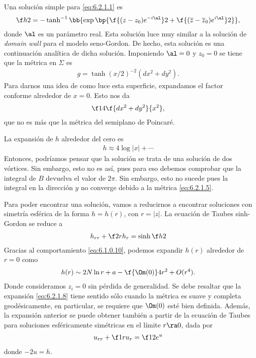 Una solución simple para \eqref{eq:6.2.1.1} es
\begin{align}
	\f h2 = -\tanh^{-1}\bb{\exp\bp{\f{(z-z_0)e^{-i\al}}2+\f{(\overline z-\overline z_0)e^{i\al}}2}},
\end{align}
donde $\al$ es un parámetro real. Esta solución luce muy similar a la solución de \emph{domain wall} para el modelo seno-Gordon. De hecho, esta solución es una continuación analítica de dicha solución. Imponiendo $\al=0$ y $z_0=0$ se tiene que la métrica en $\Sigma$ es
\begin{align}
	g = \tanh(x/2)^{-2}(dx^2+dy^2).
\end{align}
Para darnos una idea de como luce esta superficie, expandamos el factor conforme alrededor de $x=0$. Esto nos da
\begin{align}
	\f 14\f{dx^2+dy^2}{x^2}, \label{eq:6.2.1.5}
\end{align}
que no es más que la métrica del semiplano de Poincaré.

La expansión de $h$ alrededor del cero es
\begin{align}
	h\approx 4\log|x|+\cdots
\end{align}
Entonces, podríamos pensar que la solución se trata de una solución de dos vórtices. Sin embargo, esto no es así, pues para eso debemos comprobar que la integral de $B$ devuelva el valor de $2\pi$. Sin embargo, esto no sucede pues la integral en la dirección $y$ no converge debido a la métrica \eqref{eq:6.2.1.5}.

Para poder encontrar una solución, vamos a reducirnos a encontrar soluciones con simetría esférica de la forma $h=h(r)$, con $r=|z|$. La ecuación de Taubes sinh-Gordon se reduce a
\begin{align}
	h_{rr}+\f 2r h_r = \sinh\f h2 \label{eq:6.2.1.7}
\end{align}
Gracias al comportamiento \eqref{eq:6.1.0.10}, podemos expandir $h(r)$ alrededor de $r=0$ como
\begin{align}
	h(r)\sim 2N\ln r+a-\f{\Om(0)}4 r^2+O(r^4). \label{eq:6.2.1.8}
\end{align}
Donde consideramos $z_i=0$ sin pérdida de generalidad. Se debe resaltar que la expansión \eqref{eq:6.2.1.8} tiene sentido sólo cuando la métrica es suave y completa geodésicamente, en particular, se requiere que $\Om(0)$ esté bien definida. Además, la expansión anterior se puede obtener también a partir de la ecuación de Taubes para soluciones esféricamente simétricas en el límite $r\ra 0$, dada por
\begin{align}
	u_{rr}+\f 1r u_r = \f 12e^{u} \label{eq:6.2.1.9}
\end{align}
donde $-2u=h$.

